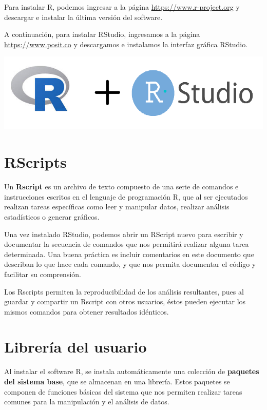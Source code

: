 \documentclass[
]{book}
\begin{document}
Para instalar R, podemos ingresar a la página \url{https://www.r-project.org} y descargar e instalar la última versión del software.

A continuación, para instalar RStudio, ingresamos a la página \url{https://www.posit.co} y descargamos e instalamos la interfaz gráfica RStudio.

\includegraphics{RyRStudio.png}

\hypertarget{rscripts}{%
\section{RScripts}\label{rscripts}}

Un \textbf{Rscript} es un archivo de texto compuesto de una serie de comandos e instrucciones escritos en el lenguaje de programación R, que al ser ejecutados realizan tareas específicas como leer y manipular datos, realizar análisis estadísticos o generar gráficos.

Una vez instalado RStudio, podemos abrir un RScript nuevo para escribir y documentar la secuencia de comandos que nos permitirá realizar alguna tarea determinada. Una buena práctica es incluir comentarios en este documento que describan lo que hace cada comando, y que nos permita documentar el código y facilitar su comprensión.

Los Rscripts permiten la reproducibilidad de los análisis resultantes, pues al guardar y compartir un Rscript con otros usuarios, éstos pueden ejecutar los mismos comandos para obtener resultados idénticos.

\hypertarget{libreruxeda-del-usuario}{%
\section{Librería del usuario}\label{libreruxeda-del-usuario}}

Al instalar el software R, se instala automáticamente una colección de \textbf{paquetes del sistema base}, que se almacenan en una librería. Estos paquetes se componen de funciones básicas del sistema que nos permiten realizar tareas comunes para la manipulación y el análisis de datos.
\end{document}
